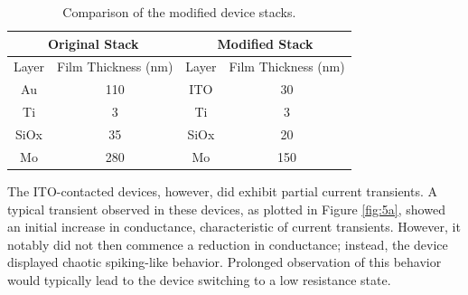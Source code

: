 \begin{table}[ht]
    \caption{Comparison of the modified device stacks.}
    \centering
    \begin{tabular}{|cc|cc|}
    \hline
    \multicolumn{2}{|c|}{Original Stack}              & \multicolumn{2}{c|}{Modified Stack}              \\ \hline
    \multicolumn{1}{|c|}{Layer} & Film Thickness (nm) & \multicolumn{1}{c|}{Layer} & Film Thickness (nm) \\ \hline
    \multicolumn{1}{|c|}{Au}    & 110                 & \multicolumn{1}{c|}{ITO}   & 30                  \\ \hline
    \multicolumn{1}{|c|}{Ti}    & 3                   & \multicolumn{1}{c|}{Ti}    & 3                   \\ \hline
    \multicolumn{1}{|c|}{SiOx}  & 35                  & \multicolumn{1}{c|}{SiOx}  & 20                  \\ \hline
    \multicolumn{1}{|c|}{Mo}    & 280                 & \multicolumn{1}{c|}{Mo}    & 150                 \\ \hline
    \end{tabular}
    \label{table:5a}
\end{table}



\noindent The ITO-contacted devices, however, did exhibit partial current transients. A typical transient observed in these devices, as plotted in Figure \ref{fig:5a}, showed an initial increase in conductance, characteristic of current transients. However, it notably did not then commence a reduction in conductance; instead, the device displayed chaotic spiking-like behavior. Prolonged observation of this behavior would typically lead to the device switching to a low resistance state.\\

